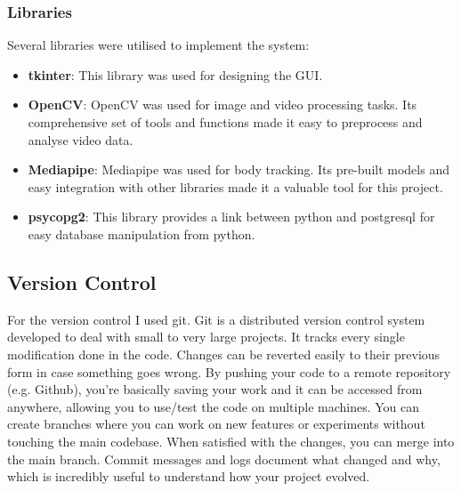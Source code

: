         \subsubsection{Libraries}
        Several libraries were utilised to implement the system:
        \begin{itemize}
            \item \textbf{tkinter}: This library was used for designing the GUI.
            \item \textbf{OpenCV}: OpenCV was used for image and video processing tasks. Its comprehensive set of tools and functions made it easy to preprocess and analyse video data.
            \item \textbf{Mediapipe}: Mediapipe was used for body tracking. Its pre-built models and easy integration with other libraries made it a valuable tool for this project.
            \item \textbf{psycopg2}: This library provides a link between python and postgresql for easy database manipulation from python.
        \end{itemize}
        
    \subsection{Version Control}
        For the version control I used git. Git is a distributed version control system developed to deal with small to very large projects. It tracks every single modification done in the code. Changes can be reverted easily to their previous form in case something goes wrong. By pushing your code to a remote repository (e.g. Github), you're basically saving your work and it can be accessed from anywhere, allowing you to use/test the code on multiple machines. You can create branches where you can work on new features or experiments without touching the main codebase. When satisfied with the changes, you can merge into the main branch. Commit messages and logs document what changed and why, which is incredibly useful to understand how your project evolved.
        
